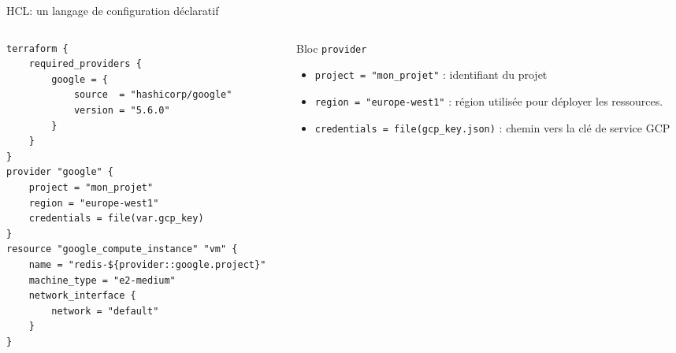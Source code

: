 \documentclass[aspectratio=169,10pt]{beamer}
\begin{document}
\begin{frame}[fragile]{HCL: un langage de configuration déclaratif}

\begin{columns}[T]
  \begin{column}{0.55\textwidth}
    \begin{lstlisting}[language=HCL, basicstyle=\ttfamily\scriptsize]
terraform {
    required_providers {
        google = {
            source  = "hashicorp/google"   
            version = "5.6.0"
        }
    }
}
provider "google" {
    project = "mon_projet"
    region = "europe-west1"
    credentials = file(var.gcp_key)
}
resource "google_compute_instance" "vm" {
    name = "redis-${provider::google.project}"
    machine_type = "e2-medium"
    network_interface {
        network = "default"
    }
}
\end{lstlisting}
  \end{column}

  \begin{column}{0.45\textwidth}
    \begin{block}{Bloc \lstinline[language=HCL]!provider!}
    \begin{itemize}
\item \lstinline[language=HCL]!project = "mon_projet"! : identifiant du projet
\item \lstinline[language=HCL]!region = "europe-west1"! : région utilisée pour déployer les ressources.
\item \lstinline[language=HCL]!credentials = file(gcp_key.json)! : chemin vers la clé de service GCP
    \end{itemize}
    \end{block}
  \end{column}
\end{columns}

\end{frame}
\end{document}
